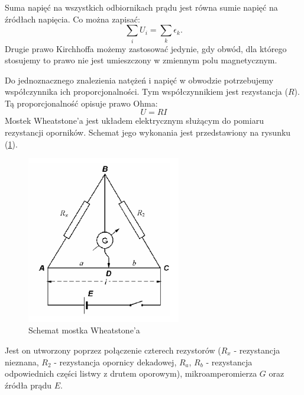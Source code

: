 \documentclass [a4paper,11pt]{article}
\begin{document}
	Suma napięć na wszystkich odbiornikach prądu jest równa sumie napięć na źródłach napięcia. Co można zapisać:
	\begin{equation}
	\label{eq:DPK}
	\sum_{i}U_i=\sum_{k}\epsilon_k \text{.}
	\end{equation}	
	Drugie prawo Kirchhoffa możemy zastosować jedynie, gdy obwód, dla którego stosujemy to prawo nie jest umieszczony w zmiennym polu magnetycznym.
	
	Do jednoznacznego znalezienia natężeń i napięć w obwodzie potrzebujemy współczynnika ich proporcjonalności. Tym współczynnikiem jest rezystancja ($R$). Tą proporcjonalność opisuje prawo Ohma:
	\begin{equation}
	\label{eq:PO}
	U=RI
	\end{equation}
	Mostek Wheatstone'a jest układem elektrycznym służącym do pomiaru rezystancji oporników. Schemat jego wykonania jest przedstawiony na rysunku (\ref{fig:mostek}).
	\begin{figure}[!h]
		\centering
		\includegraphics[width=0.6\textwidth]{mostek}
		\caption{Schemat mostka Wheatstone'a}
		\label{fig:mostek}
	\end{figure}

	Jest on utworzony poprzez połączenie czterech rezystorów ($R_x$ - rezystancja nieznana, $R_2$ - rezystancja opornicy dekadowej, $R_a$, $R_b$ - rezystancja odpowiednich części listwy z drutem oporowym), mikroamperomierza $G$ oraz źródła prądu $E$.
	
\end{document}
